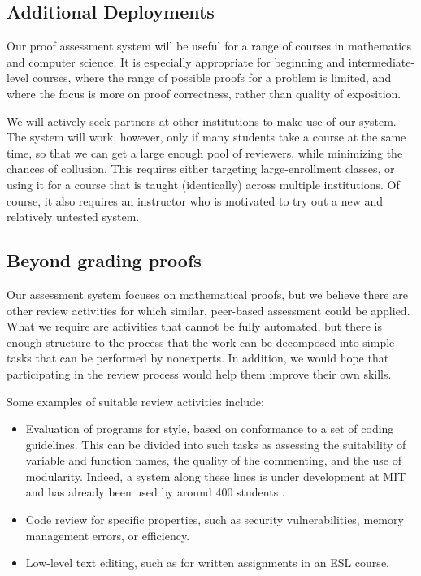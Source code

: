 \documentclass[12pt]{article}
\begin{document}
\subsection{Additional Deployments}

Our proof assessment system will be useful for a range of courses in
mathematics and computer science.  It is especially appropriate for
beginning and intermediate-level courses, where the range of possible
proofs for a problem is limited, and where the focus is more on proof
correctness, rather than quality of exposition.

We will actively seek partners at other institutions to make use of
our system.  The system will work, however, only if many students take
a course at the same time, so that we can get a large enough pool of
reviewers, while minimizing the chances of collusion.  This requires
either targeting large-enrollment classes, or using it for a course
that is taught (identically) across multiple institutions.  Of course,
it also requires an instructor who is motivated to try
out a new and relatively untested system.

\subsection{Beyond grading proofs}

Our assessment system focuses on mathematical proofs, but we believe
there are other review activities for which similar, peer-based assessment
could be applied.  What we require are activities that cannot
be fully automated, but there is enough structure to the process that
the work can be decomposed into simple tasks that can be performed by
nonexperts.  In addition, we would hope that participating in the review
process would help them improve their own skills.

Some examples of suitable review activities include:
\begin{itemize}
\item
Evaluation of programs for style, based on conformance to a set of
coding guidelines.  This can be divided into such tasks as assessing
the suitability of variable and function names, the quality of the
commenting, and the use of modularity.  Indeed, a system along these
lines is under development at MIT and has already been used by around 400
students \citep{tang-mit11}.

\item
Code review for specific properties, such as security vulnerabilities,
memory management errors, or efficiency.

\item
Low-level text editing, such as for written assignments in an ESL course.
\end{itemize}
\end{document}
